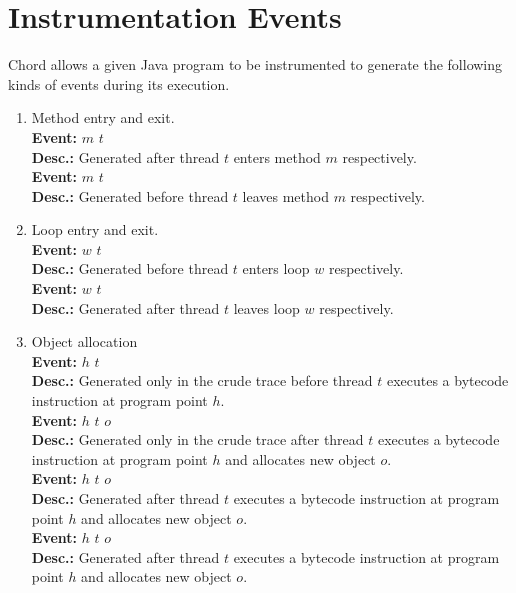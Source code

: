 \section{Instrumentation Events}
\label{sec:instr-events}

Chord allows a given Java program to be instrumented to generate the
following kinds of events during its execution.

\begin{enumerate}
\item
Method entry and exit. \\
{\bf Event:}  $m$ $t$ \\
{\bf Desc.:} Generated after thread $t$ enters method $m$ respectively. \\
{\bf Event:}  $m$ $t$ \\
{\bf Desc.:} Generated before thread $t$ leaves method $m$ respectively.

\item
Loop entry and exit. \\
{\bf Event:}  $w$ $t$ \\
{\bf Desc.:} Generated before thread $t$ enters loop $w$ respectively. \\
{\bf Event:}  $w$ $t$ \\
{\bf Desc.:} Generated after thread $t$ leaves loop $w$ respectively.

\item
Object allocation \\
{\bf Event:}  $h$ $t$ \\
{\bf Desc.:} Generated only in the crude trace before thread $t$ executes a  bytecode instruction at program point $h$. \\
{\bf Event:}  $h$ $t$ $o$ \\
{\bf Desc.:} Generated only in the crude trace after thread $t$ executes a  bytecode instruction at program point $h$ and allocates new object $o$. \\
{\bf Event:}  $h$ $t$ $o$ \\
{\bf Desc.:} Generated after thread $t$ executes a  bytecode instruction at program point $h$ and allocates new object $o$. \\
{\bf Event:}  $h$ $t$ $o$ \\
{\bf Desc.:} Generated after thread $t$ executes a  bytecode instruction at program point $h$ and allocates new object $o$.


\end{enumerate}
